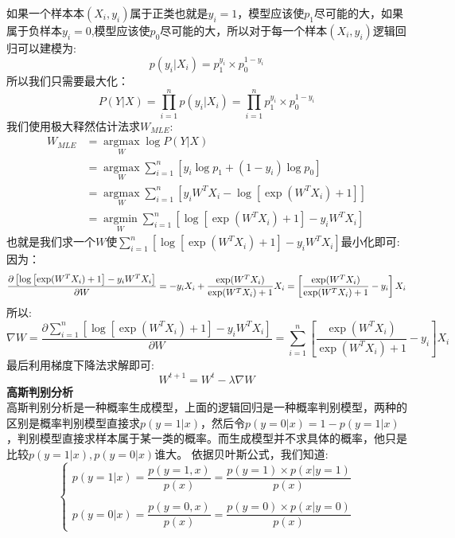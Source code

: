 \documentclass[withoutpreface,bwprint]{cumcmthesis} %
\begin{document}
	如果一个样本本$(X_i,y_i)$属于正类也就是$y_i=1$，模型应该使$p_1$尽可能的大，如果属于负样本$y_i=0$,模型应该使$p_0$尽可能的大，所以对于每一个样本$(X_i,y_i)$逻辑回归可以建模为:
	\begin{equation}
		p(y_i|X_i)=p_1^{y_i}\times p_0^{1-y_i}
	\end{equation}
	所以我们只需要最大化：
	\begin{equation*}
		P(Y|X)=\prod \limits_{i=1}^n p(y_i|X_i)=\prod \limits_{i=1}^n p_1^{y_i}\times p_0^{1-y_i}
	\end{equation*}
	我们使用极大释然估计法求$W_{MLE}$:
	\begin{align*}
		W_{MLE}&={\mathop{argmax}\limits_{W}} \log P(Y|X)\\
			&={\mathop{argmax}\limits_{W}} \sum_{i=1}^{n} \left[ y_i \log p_1  +(1-y_i) \log p_0  \right]\\
			&={\mathop{argmax}\limits_{W}} \sum_{i=1}^{n} \left[ y_iW^TX_i - \log \left[\exp(W^TX_i) +1\right] \right]\\
			&={\mathop{argmin}\limits_{W}} \sum_{i=1}^{n} \left[\log \left[\exp(W^TX_i) +1\right]- y_iW^TX_i \right]
	\end{align*}
	也就是我们求一个$W$使$\sum_{i=1}^{n} \left[\log \left[\exp(W^TX_i) +1\right]- y_iW^TX_i \right]$最小化即可:\\
	因为：
	\begin{equation}
		\frac{\partial \left[\log \left[\exp(W^TX_i) +1\right]- y_iW^TX_i \right]}{\partial W}=-y_iX_i+\dfrac{\exp(W^TX_i)}{\exp(W^TX_i) +1}X_i\\
		=\left[ \dfrac{\exp(W^TX_i)}{\exp(W^TX_i) +1}-y_i\right]X_i
	\end{equation}
	所以:
	\begin{equation}
		\nabla W=\frac{\partial \sum_{i=1}^{n} \left[\log \left[\exp(W^TX_i) +1\right]- y_iW^TX_i \right]}{\partial W}
		= 
		\sum_{i=1}^{n} \left[ \dfrac{\exp(W^TX_i)}{\exp(W^TX_i) +1}-y_i\right]X_i
	\end{equation}
	最后利用梯度下降法求解即可:
	\begin{equation}
		W^{t+1}=W^{t}-\lambda \nabla W
	\end{equation}
	\textbf{高斯判别分析}\\
	高斯判别分析是一种概率生成模型，上面的逻辑回归是一种概率判别模型，两种的区别是概率判别模型直接求$p(y=1|x)$，然后令$p(y=0|x)=1-p(y=1|x)$，判别模型直接求样本属于某一类的概率。而生成模型并不求具体的概率，他只是比较$p(y=1|x),p(y=0|x)$谁大。
	依据贝叶斯公式，我们知道:
	\begin{equation}
		\begin{cases}
			p(y=1|x)=\dfrac{p(y=1,x)}{p(x)}=\dfrac{p(y=1) \times p(x|y=1)}{p(x)}
			\\\\
			p(y=0|x)=\dfrac{p(y=0,x)}{p(x)}=\dfrac{p(y=0) \times p(x|y=0)}{p(x)} 
		\end{cases}
	\end{equation}
\end{document}
